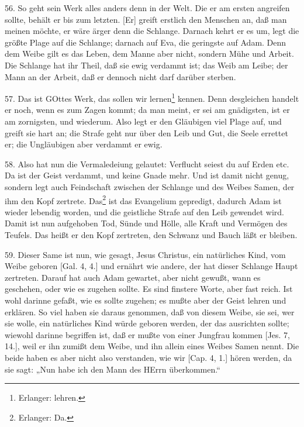 56. So geht sein Werk alles anders denn in der Welt. Die er am ersten angreifen sollte, behält er bis zum letzten. [Er] greift erstlich den Menschen an, daß man meinen möchte, er wäre ärger denn die Schlange. Darnach kehrt er es um, legt die größte Plage auf die Schlange; darnach auf Eva, die geringste auf Adam. Denn dem Weibe gilt es das Leben, dem Manne aber nicht, sondern Mühe und Arbeit. Die Schlange hat ihr Theil, daß sie ewig verdammt ist; das Weib am Leibe; der Mann an der Arbeit, daß er dennoch nicht darf darüber sterben.

57. Das ist GOttes Werk, das sollen wir lernen\footnote{Erlanger: lehren.} kennen. Denn desgleichen handelt er noch, wenn es zum Zagen kommt; da man meint, er sei am gnädigsten, ist er am zornigsten, und wiederum. Also legt er den Gläubigen viel Plage auf, und greift sie hart an; die Strafe geht nur über den Leib und Gut, die Seele errettet er; die Ungläubigen aber verdammt er ewig.

58. Also hat nun die Vermaledeiung gelautet: Verflucht seiest du auf Erden etc. Da ist der Geist verdammt, und keine Gnade mehr. Und ist damit nicht genug, sondern legt auch Feindschaft zwischen der Schlange und des Weibes Samen, der ihm den Kopf zertrete. Das\footnote{Erlanger: Da.} ist das Evangelium gepredigt, dadurch Adam ist wieder lebendig worden, und die geistliche Strafe auf den Leib gewendet wird. Damit ist nun aufgehoben Tod, Sünde und Hölle, alle Kraft und Vermögen des Teufels. Das heißt er den Kopf zertreten, den Schwanz und Bauch läßt er bleiben.

59. Dieser Same ist nun, wie gesagt, Jesus Christus, ein natürliches Kind, vom Weibe geboren [Gal. 4, 4.] und ernährt wie andere, der hat dieser Schlange Haupt zertreten. Darauf hat auch Adam gewartet, aber nicht gewußt, wann es geschehen, oder wie es zugehen sollte. Es sind finstere Worte, aber fast reich. Ist wohl darinne gefaßt, wie es sollte zugehen; es mußte aber der Geist lehren und erklären. So viel haben sie daraus genommen, daß von diesem Weibe, sie sei, wer sie wolle, ein natürliches Kind würde geboren werden, der das ausrichten sollte; wiewohl darinne begriffen ist, daß er mußte von einer Jungfrau kommen [Jes. 7, 14.], weil er ihn zumißt dem Weibe, und ihn allein eines Weibes Samen nennt. Die beide haben es aber nicht also verstanden, wie wir [Cap. 4, 1.] hören werden, da sie sagt: „Nun habe ich den Mann des HErrn überkommen.“

